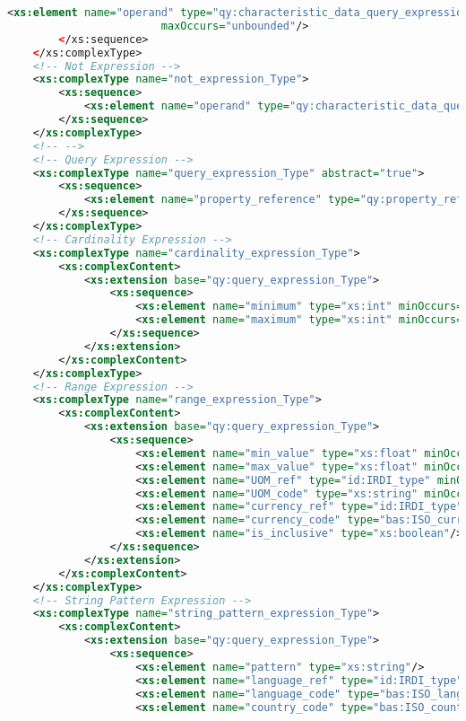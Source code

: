 \begin{lstlisting}[caption=query.xsd, language=XML, label=lst:query_xsd]
            <xs:element name="operand" type="qy:characteristic_data_query_expression_Type" minOccurs="2"
                        maxOccurs="unbounded"/>
        </xs:sequence>
    </xs:complexType>
    <!-- Not Expression -->
    <xs:complexType name="not_expression_Type">
        <xs:sequence>
            <xs:element name="operand" type="qy:characteristic_data_query_expression_Type"/>
        </xs:sequence>
    </xs:complexType>
    <!-- -->
    <!-- Query Expression -->
    <xs:complexType name="query_expression_Type" abstract="true">
        <xs:sequence>
            <xs:element name="property_reference" type="qy:property_reference_Type"/>
        </xs:sequence>
    </xs:complexType>
    <!-- Cardinality Expression -->
    <xs:complexType name="cardinality_expression_Type">
        <xs:complexContent>
            <xs:extension base="qy:query_expression_Type">
                <xs:sequence>
                    <xs:element name="minimum" type="xs:int" minOccurs="0"/>
                    <xs:element name="maximum" type="xs:int" minOccurs="0"/>
                </xs:sequence>
            </xs:extension>
        </xs:complexContent>
    </xs:complexType>
    <!-- Range Expression -->
    <xs:complexType name="range_expression_Type">
        <xs:complexContent>
            <xs:extension base="qy:query_expression_Type">
                <xs:sequence>
                    <xs:element name="min_value" type="xs:float" minOccurs="0"/>
                    <xs:element name="max_value" type="xs:float" minOccurs="0"/>
                    <xs:element name="UOM_ref" type="id:IRDI_type" minOccurs="0"/>
                    <xs:element name="UOM_code" type="xs:string" minOccurs="0"/>
                    <xs:element name="currency_ref" type="id:IRDI_type" minOccurs="0"/>
                    <xs:element name="currency_code" type="bas:ISO_currency_code_Type" minOccurs="0"/>
                    <xs:element name="is_inclusive" type="xs:boolean"/>
                </xs:sequence>
            </xs:extension>
        </xs:complexContent>
    </xs:complexType>
    <!-- String Pattern Expression -->
    <xs:complexType name="string_pattern_expression_Type">
        <xs:complexContent>
            <xs:extension base="qy:query_expression_Type">
                <xs:sequence>
                    <xs:element name="pattern" type="xs:string"/>
                    <xs:element name="language_ref" type="id:IRDI_type" minOccurs="0"/>
                    <xs:element name="language_code" type="bas:ISO_language_code_Type" minOccurs="0"/>
                    <xs:element name="country_code" type="bas:ISO_country_code_Type" minOccurs="0"/>

\end{lstlisting}
